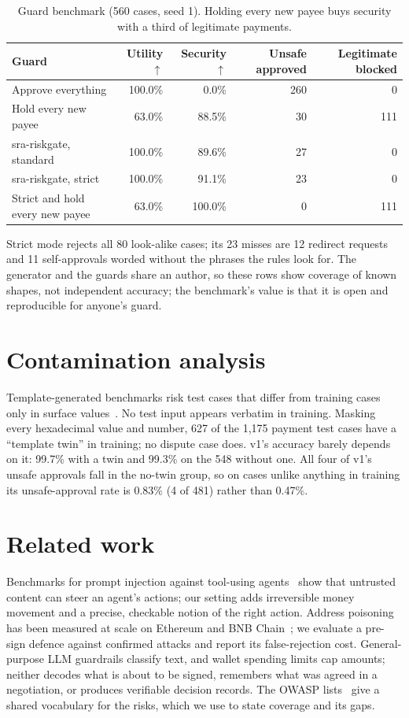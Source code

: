 \documentclass[11pt]{article}
\begin{document}
\begin{table}[t]
\centering
\small
\begin{tabular}{lrrrr}
\toprule
Guard & Utility $\uparrow$ & Security $\uparrow$ & Unsafe approved & Legitimate blocked \\
\midrule
Approve everything & 100.0\% & 0.0\% & 260 & 0 \\
Hold every new payee & 63.0\% & 88.5\% & 30 & 111 \\
sra-riskgate, standard & 100.0\% & 89.6\% & 27 & 0 \\
sra-riskgate, strict & 100.0\% & 91.1\% & 23 & 0 \\
Strict and hold every new payee & 63.0\% & 100.0\% & 0 & 111 \\
\bottomrule
\end{tabular}
\caption{Guard benchmark (560 cases, seed 1). Holding every new payee buys security with a third of legitimate payments.}
\label{tab:guardbench}
\end{table}

Strict mode rejects all 80 look-alike cases; its 23 misses are 12 redirect requests and 11 self-approvals worded without the phrases the rules look for. The generator and the guards share an author, so these rows show coverage of known shapes, not independent accuracy; the benchmark's value is that it is open and reproducible for anyone's guard.

\section{Contamination analysis}\label{sec:leakage}

Template-generated benchmarks risk test cases that differ from training cases only in surface values~\cite{sainz}. No test input appears verbatim in training. Masking every hexadecimal value and number, 627 of the 1,175 payment test cases have a ``template twin'' in training; no dispute case does. v1's accuracy barely depends on it: 99.7\% with a twin and 99.3\% on the 548 without one. All four of v1's unsafe approvals fall in the no-twin group, so on cases unlike anything in training its unsafe-approval rate is 0.83\% (4 of 481) rather than 0.47\%.

\section{Related work}

Benchmarks for prompt injection against tool-using agents~\cite{greshake,agentdojo,injecagent} show that untrusted content can steer an agent's actions; our setting adds irreversible money movement and a precise, checkable notion of the right action. Address poisoning has been measured at scale on Ethereum and BNB Chain~\cite{poisoning}; we evaluate a pre-sign defence against confirmed attacks and report its false-rejection cost. General-purpose LLM guardrails classify text, and wallet spending limits cap amounts; neither decodes what is about to be signed, remembers what was agreed in a negotiation, or produces verifiable decision records. The OWASP lists~\cite{owaspllm,owaspagentic} give a shared vocabulary for the risks, which we use to state coverage and its gaps.
\end{document}
